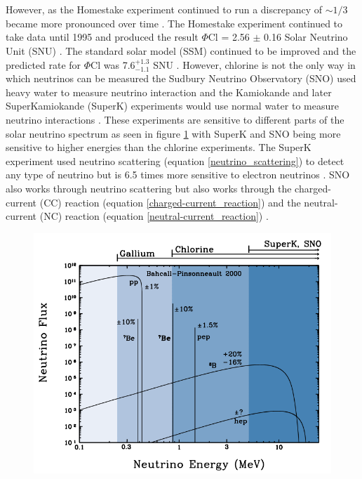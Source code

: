 \\\\However, as the Homestake experiment continued to run a discrepancy of $\sim 1/3$ became more pronounced over time \cite{griffiths2008neutrinoOscillations}. The Homestake experiment continued to take data until 1995 and produced the result $\Phi$Cl = 2.56 $\pm$ 0.16 Solar Neutrino Unit (SNU) \cite{Bellerive:2003rj}. The standard solar model (SSM) continued to be improved and the predicted rate for $\Phi$Cl was 7.6$^{+ 1.3}_{-1.1}$ SNU \cite{Bellerive:2003rj}. However, chlorine is not the only way in which neutrinos can be measured the Sudbury Neutrino Observatory (SNO) used heavy water to measure neutrino interaction and the Kamiokande and later SuperKamiokande (SuperK) experiments would use normal water to measure neutrino interactions \cite{Bellerive:2003rj}. These experiments are sensitive to different parts of the solar neutrino spectrum as seen in figure \ref{neutrino_emmision_graph} with SuperK and SNO being more sensitive to higher energies than the chlorine experiments. The SuperK experiment used neutrino scattering (equation \ref{neutrino_scattering}) to detect any type of neutrino but is 6.5 times more sensitive to electron neutrinos \cite{griffiths2008book} \cite{griffiths2008neutrinoOscillations}. SNO also works through neutrino scattering but also works through the charged-current (CC) reaction (equation \ref{charged-current_reaction}) and  the neutral-current (NC) reaction (equation \ref{neutral-current_reaction}) \cite{sno2001}\cite{Bellerive:2003rj} \cite{griffiths2008book} \cite{griffiths2008neutrinoOscillations}. 
\begin{figure}[!h]
 \centering
 \includegraphics[width=0.7\linewidth]{Chapter1/Figs/Raster/neutrino_emmision_graph.png}
 \label{neutrino_emmision_graph}
\end{figure}
